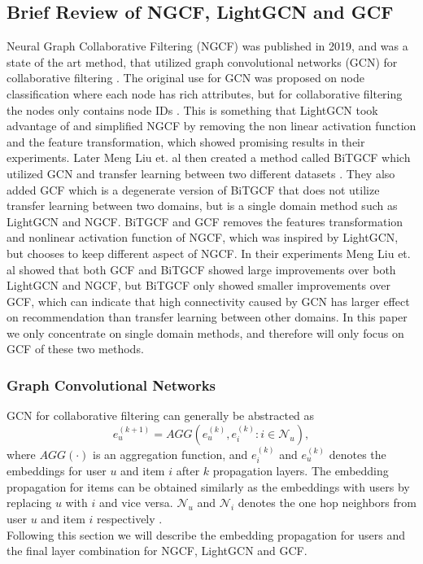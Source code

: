 \subsection{Brief Review of NGCF, LightGCN and GCF}
Neural Graph Collaborative Filtering (NGCF) was published in 2019, and was a state of the art method, that utilized graph convolutional networks (GCN) for collaborative filtering \cite{NGCF_2019}.
The original use for GCN was proposed on node classification where each node has rich attributes, but for collaborative filtering the nodes only contains node IDs \cite{lightgcn,kipf2017semisupervised,NGCF_2019}.
This is something that LightGCN took advantage of and simplified NGCF by removing the non linear activation function and the feature transformation, which showed promising results in their experiments.
Later Meng Liu et. al then created a method called BiTGCF which utilized GCN and transfer learning between two different datasets \cite{BiTGCF}.
They also added GCF which is a degenerate version of BiTGCF that does not utilize transfer learning between two domains, but is a single domain method such as LightGCN and NGCF.
BiTGCF and GCF removes the features transformation and nonlinear activation function of NGCF, which was inspired by LightGCN, but chooses to keep different aspect of NGCF.
In their experiments Meng Liu et. al showed that both GCF and BiTGCF showed large improvements over both LightGCN and NGCF, but BiTGCF only showed smaller improvements over GCF, which can indicate that high connectivity caused by GCN has larger effect on recommendation than transfer learning between other domains.
In this paper we only concentrate on single domain methods, and therefore will only focus on GCF of these two methods.

\subsubsection{Graph Convolutional Networks}
GCN for collaborative filtering can generally be abstracted as \cite{BiTGCF}
\begin{equation}
    e_u^{(k+1)} = AGG(e_u^{(k)},e_i^{(k)} : i \in \mathcal{N}_u),
\end{equation}
where $AGG(\cdot)$ is an aggregation function, and $e_i^{(k)}$ and $e_u^{(k)}$ denotes the embeddings for user $u$ and item $i$ after $k$ propagation layers.
The embedding propagation for items can be obtained similarly as the embeddings with users by replacing $u$ with $i$ and vice versa.
$\mathcal{N}_u$ and $\mathcal{N}_i$ denotes the one hop neighbors from user $u$ and item $i$ respectively \cite{lightgcn,BiTGCF,NGCF_2019}.\\
Following this section we will describe the embedding propagation for users and the final layer combination for NGCF, LightGCN and GCF.

